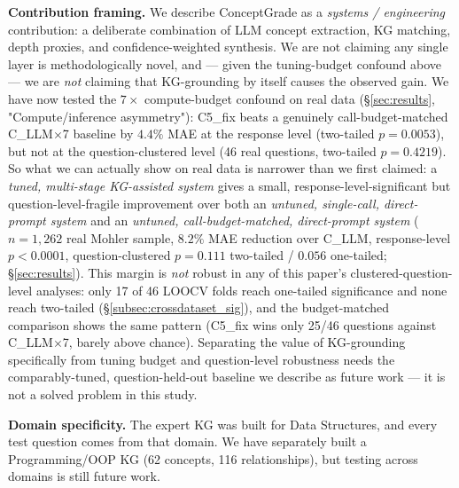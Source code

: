 \documentclass[conference]{IEEEtran}
\begin{document}
\textbf{Contribution framing.} We describe ConceptGrade as a
\emph{systems / engineering} contribution: a deliberate combination of
LLM concept extraction, KG matching, depth proxies, and
confidence-weighted synthesis. We are not claiming any single layer is
methodologically novel, and --- given the tuning-budget confound above
--- we are \emph{not} claiming that KG-grounding by itself causes the
observed gain. We have now tested the $7\times$ compute-budget confound
on real data (\S\ref{sec:results}, "Compute/inference asymmetry"):
C5\_fix beats a genuinely call-budget-matched C\_LLM$\times$7 baseline
by $4.4\%$ MAE at the response level (two-tailed $p=0.0053$), but not at
the question-clustered level (46 real questions, two-tailed
$p=0.4219$). So what we can actually show on real data is narrower than
we first claimed: a \emph{tuned, multi-stage KG-assisted system}
gives a small, response-level-significant but question-level-fragile
improvement over both an \emph{untuned, single-call, direct-prompt
system} and an \emph{untuned, call-budget-matched, direct-prompt
system} ($n=1{,}262$ real Mohler sample, $8.2\%$ MAE reduction over
C\_LLM, response-level $p<0.0001$, question-clustered $p=0.111$
two-tailed / $0.056$ one-tailed; \S\ref{sec:results}). This margin is
\emph{not} robust in any of this paper's clustered-question-level
analyses: only 17 of 46 LOOCV folds reach one-tailed significance and
none reach two-tailed (\S\ref{subsec:crossdataset_sig}), and the
budget-matched comparison shows the same pattern (C5\_fix wins only
25/46 questions against C\_LLM$\times$7, barely above chance).
Separating the value of KG-grounding specifically from tuning budget
and question-level robustness needs the comparably-tuned,
question-held-out baseline we describe as future work --- it is not a
solved problem in this study.

\textbf{Domain specificity.} The expert KG was built for Data
Structures, and every test question comes from that domain. We have
separately built a Programming/OOP KG (62 concepts, 116 relationships),
but testing across domains is still future work.
\end{document}
